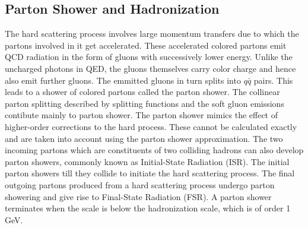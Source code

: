 \subsection{Parton Shower and Hadronization}
The hard scattering process involves large momentum transfers due to which the partons involved in it get accelerated. These accelerated colored partons emit QCD radiation in the form of gluons with successively lower energy. Unlike the uncharged photons in QED, the gluons themselves carry color charge and hence also emit further gluons. The emmitted gluons in turn splits into $q\bar{q}$ pairs. This leads to a shower of colored partons called the parton shower. The collinear parton splitting described by splitting functions and the soft gluon emissions contibute mainly to parton shower. The parton shower mimics the effect of higher-order corrections to the hard process. These cannot be calculated exactly and are taken into account using the parton shower approximation. The two incoming partons which are constituents of two colliding hadrons can also develop parton showers, commonly known as Initial-State Radiation (ISR). The initial parton showers till they collide to initiate the hard scattering process. The final outgoing partons produced from a hard scattering process undergo parton showering and give rise to Final-State Radiation (FSR). A parton shower terminates when the scale is below the hadronization scale, which is of order 1 GeV.

